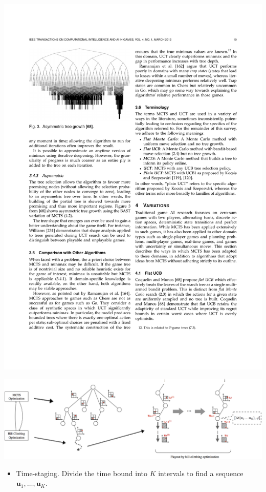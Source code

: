 \documentclass[a0paper,portrait]{baposter}
\newcommand{\bu}{\mathbf{u}}
\begin{document}
\begin{poster}
{\begin{minipage}[h]{0.22\textwidth}
\centering\includegraphics[scale=0.4]{figures/mcts.pdf}
\end{minipage}
\begin{minipage}[h]{0.78\textwidth}
\centering\includegraphics[scale=.1]{figures/algorithm.png}
\end{minipage}




\begin{itemize}
\vspace{-0.6em}
\item Time-staging. Divide the time bound into $K$ intervals to find a sequence $\bu_{1},\dotsc,\bu_{K}$.



\end{itemize}}
\end{poster}
\end{document}
